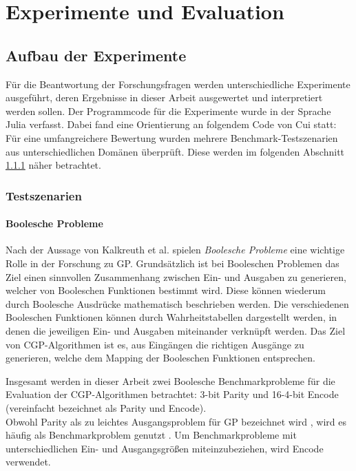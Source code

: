 \chapter{Experimente und Evaluation}
\label{praktischer Teil}

\section{Aufbau der Experimente}
\label{sec:aufbauExperimente}

Für die Beantwortung der Forschungsfragen werden unterschiedliche Experimente ausgeführt, deren Ergebnisse in dieser Arbeit ausgewertet und interpretiert werden sollen.
Der Programmcode für die Experimente wurde in der Sprache Julia verfasst.
Dabei fand eine Orientierung an folgendem Code von Cui statt: \cite{cuihen_cuihencgp_with_crossover_strategies_2024}\\
Für eine umfangreichere Bewertung wurden mehrere Benchmark-Testszenarien aus unterschiedlichen Domänen überprüft.
Diese werden im folgenden Abschnitt \ref{subsec:testszenarien} näher betrachtet.

\subsection{Testszenarien}
\label{subsec:testszenarien}

\subsubsection{Boolesche Probleme}
\label{subsubsec:booleanProblems}

Nach der Aussage von Kalkreuth et al. spielen \emph{Boolesche Probleme} eine wichtige Rolle in der Forschung zu GP.
Grundsätzlich ist bei Booleschen Problemen das Ziel einen sinnvollen Zusammenhang zwischen Ein- und Ausgaben zu generieren, welcher von Booleschen Funktionen bestimmt wird.
Diese können wiederum durch Boolesche Ausdrücke mathematisch beschrieben werden.
Die verschiedenen Booleschen Funktionen können durch Wahrheitstabellen dargestellt werden, in denen die jeweiligen Ein- und Ausgaben miteinander verknüpft werden. \cite{kalkreuth_towards_2023}
Das Ziel von CGP-Algorithmen ist es, aus Eingängen die richtigen Ausgänge zu generieren, welche dem Mapping der Booleschen Funktionen entsprechen.

Insgesamt werden in dieser Arbeit zwei Boolesche Benchmarkprobleme für die Evaluation der CGP-Algorithmen betrachtet: 3-bit Parity und 16-4-bit Encode (vereinfacht bezeichnet als Parity und Encode).\\
Obwohl Parity als zu leichtes Ausgangsproblem für GP bezeichnet wird \cite{white_better_2013}, wird es häufig als Benchmarkproblem genutzt \cite{yu_neutrality_2001, kaufmann_kalkreuth_2017, kaufmann_kalkreuth_2020}.
Um Benchmarkprobleme mit unterschiedlichen Ein- und Ausgangsgrößen miteinzubeziehen, wird Encode verwendet.

